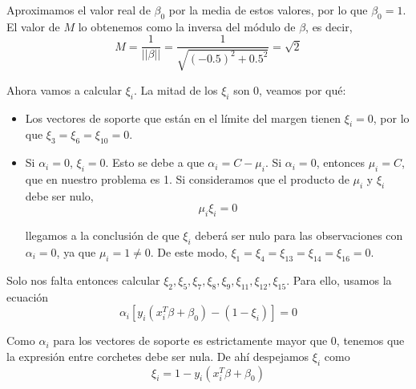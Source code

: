 \begin{example}
Aproximamos el valor real de $\beta_0$ por la media de estos valores, por lo que $\beta_0 = 1$. El valor de $M$ lo obtenemos como la inversa del módulo de $\beta$, es decir, 
\begin{equation}
M = \frac{1}{|| \beta ||} = \frac{1}{\sqrt{(-0.5)^2 + 0.5^2}} = \sqrt{2}
\end{equation}

Ahora vamos a calcular $\xi_i$. La mitad de los $\xi_i$ son 0, veamos por qué:
\begin{itemize}
\item Los vectores de soporte que están en el límite del margen tienen $\xi_i = 0$, por lo que $\xi_3 = \xi_6 = \xi_{10} = 0$.
\item Si $\alpha_i = 0$, $\xi_i = 0$. Esto se debe a que $\alpha_i = C - \mu_i$. Si $\alpha_i = 0$, entonces $\mu_i = C$, que en nuestro problema es 1. Si consideramos que el producto de $\mu_i$ y $\xi_i$ debe ser nulo, 
\begin{equation}
\mu_i \xi_i = 0
\end{equation}

llegamos a la conclusión de que $\xi_i$ deberá ser nulo para las observaciones con $\alpha_i = 0$, ya que $\mu_i = 1 \neq 0$. De este modo, $\xi_1 = \xi_4 = \xi_{13} = \xi_{14} = \xi_{16} = 0$.
\end{itemize}

\noindent Solo nos falta entonces calcular $\xi_2, \xi_5, \xi_7, \xi_8, \xi_9, \xi_{11}, \xi_{12}, \xi_{15}$. Para ello, usamos la ecuación
\begin{equation}
\alpha_i [y_i (x_i^T \beta + \beta_0) - (1 - \xi_i)] = 0
\end{equation}

Como $\alpha_i$ para los vectores de soporte es estrictamente mayor que 0, tenemos que la expresión entre corchetes debe ser nula. De ahí despejamos $\xi_i$ como 
\begin{equation}
\xi_i = 1 - y_i (x_i^T \beta + \beta_0)
\end{equation}


\end{example}
